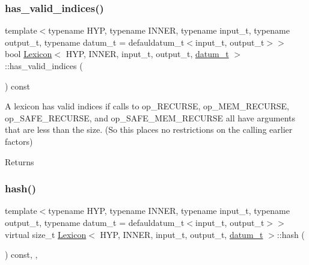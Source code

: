 \subsubsection{\texorpdfstring{has\+\_\+valid\+\_\+indices()}{has\_valid\_indices()}}
{\footnotesize\ttfamily template$<$typename H\+YP, typename I\+N\+N\+ER, typename input\+\_\+t, typename output\+\_\+t, typename datum\+\_\+t = defauldatum\+\_\+t$<$input\+\_\+t, output\+\_\+t$>$$>$ \\
bool \hyperlink{class_lexicon}{Lexicon}$<$ H\+YP, I\+N\+N\+ER, input\+\_\+t, output\+\_\+t, \hyperlink{class_bayesable_a9f1a6c0cd7855550fa10b1a8f13a5867}{datum\+\_\+t} $>$\+::has\+\_\+valid\+\_\+indices (\begin{DoxyParamCaption}{ }\end{DoxyParamCaption}) const\hspace{0.3cm}{\ttfamily [inline]}}

A lexicon has valid indices if calls to op\+\_\+\+R\+E\+C\+U\+R\+SE, op\+\_\+\+M\+E\+M\+\_\+\+R\+E\+C\+U\+R\+SE, op\+\_\+\+S\+A\+F\+E\+\_\+\+R\+E\+C\+U\+R\+SE, and op\+\_\+\+S\+A\+F\+E\+\_\+\+M\+E\+M\+\_\+\+R\+E\+C\+U\+R\+SE all have arguments that are less than the size. (So this places no restrictions on the calling earlier factors) \begin{DoxyReturn}{Returns}

\end{DoxyReturn}
\mbox{\label{class_lexicon_afbefa510e623ee4a407a1e1e04f42fb2}} 
\subsubsection{\texorpdfstring{hash()}{hash()}}
{\footnotesize\ttfamily template$<$typename H\+YP, typename I\+N\+N\+ER, typename input\+\_\+t, typename output\+\_\+t, typename datum\+\_\+t = defauldatum\+\_\+t$<$input\+\_\+t, output\+\_\+t$>$$>$ \\
virtual size\+\_\+t \hyperlink{class_lexicon}{Lexicon}$<$ H\+YP, I\+N\+N\+ER, input\+\_\+t, output\+\_\+t, \hyperlink{class_bayesable_a9f1a6c0cd7855550fa10b1a8f13a5867}{datum\+\_\+t} $>$\+::hash (\begin{DoxyParamCaption}{ }\end{DoxyParamCaption}) const\hspace{0.3cm}{\ttfamily [inline]}, {\ttfamily [override]}, {\ttfamily [virtual]}}



